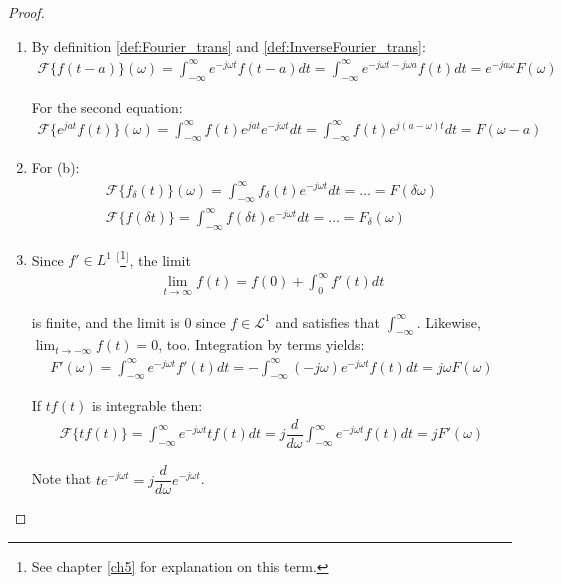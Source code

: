 \begin{proof}
\begin{enumerate}[label=(\alph*)]
\item
By definition \ref{def:Fourier_trans} and \ref{def:InverseFourier_trans}:
\begin{align*}
\mathcal{F}\{f(t-a)\}(\omega) = \int_{-\infty}^\infty e^{-j\omega t} f(t - a) dt = \int_{-\infty}^\infty e^{-j\omega t - j\omega a} f(t) dt = e^{-ja \omega} F(\omega)
\end{align*}

For the second equation:
\begin{align*}
\mathcal{F}\{e^{jat} f(t)\}(\omega) = \int_{-\infty}^\infty f(t) e^{jat} e^{-j \omega t} dt = \int_{-\infty}^\infty f(t) e^{j(a- \omega)t} dt = F(\omega - a)
\end{align*}

\item For (b):
\begin{align*}
\mathcal{F}\{f_\delta(t)\}(\omega) = \int_{-\infty}^\infty f_\delta(t) e^{-j \omega t} dt = \dots = F(\delta\omega) \\
\mathcal{F}\{f(\delta t)\} = \int_{-\infty}^\infty f(\delta t) e^{-j \omega t} dt = \dots = F_\delta(\omega)
\end{align*}

\item Since $f' \in L^1$ $^[$\footnote{See chapter \ref{ch5} for explanation on this term.}$^]$, the limit
\begin{align*}
\lim_{t \to \infty} f(t) = f(0) + \int_0^\infty f'(t) dt
\end{align*}

is finite, and the limit is 0 since $f\in \mathcal{L}^1$ and satisfies that $\int_{-\infty}^\infty$. Likewise, $\displaystyle{\lim_{t \to -\infty} f(t) = 0}$, too. Integration by terms yields:
\begin{align*}
F'(\omega) = \int_{-\infty}^\infty e^{-j \omega t} f'(t) dt = - \int_{-\infty}^\infty (-j \omega) e^{-j \omega t} f(t) dt = j\omega F(\omega)
\end{align*}

If $tf(t)$ is integrable then:
\begin{align*}
\mathcal{F}\{tf(t)\} = \int_{-\infty}^\infty e^{-j \omega t} t f(t) dt = j \dfrac{d}{d\omega} \int_{-\infty}^\infty e^{-j \omega t} f(t) dt = j F'(\omega)
\end{align*}

Note that $t e^{-j \omega t} = j \dfrac{d}{d\omega} e^{-j\omega t}$.


\end{enumerate}
\end{proof}
